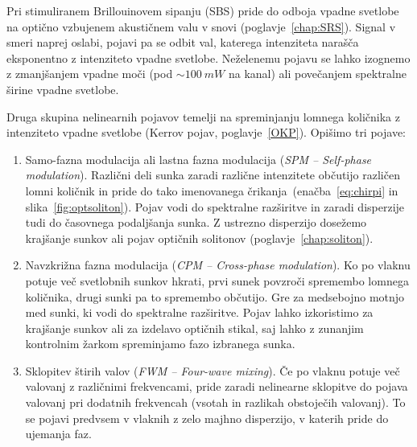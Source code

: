 Pri stimuliranem Brillouinovem sipanju (SBS) pride
 do odboja vpadne svetlobe na 
optično vzbujenem akustičnem valu v snovi (poglavje~\ref{chap:SRS}). Signal
v smeri naprej oslabi, pojavi pa se odbit val, katerega intenziteta
narašča eksponentno z intenziteto vpadne svetlobe. 
Neželenemu pojavu se lahko izognemo z zmanjšanjem vpadne
moči (pod $\sim 100~\si{mW}$ na kanal) 
ali povečanjem spektralne širine vpadne svetlobe.

Druga skupina nelinearnih pojavov temelji na spreminjanju 
lomnega količnika z intenziteto vpadne svetlobe (Kerrov pojav, poglavje~\ref{OKP}).
Opišimo tri pojave:
\begin{enumerate}
\item 
Samo-fazna modulacija ali lastna fazna modulacija ({\it SPM -- Self-phase modulation}). Različni deli
sunka zaradi različne intenzitete občutijo različen lomni količnik in pride
do tako imenovanega črikanja~(enačba~\ref{eq:chirpi} 
in slika~\ref{fig:optsoliton}). 
Pojav vodi do spektralne razširitve in zaradi
disperzije tudi do časovnega podaljšanja sunka. Z ustrezno disperzijo dosežemo 
krajšanje sunkov ali pojav optičnih solitonov (poglavje~\ref{chap:soliton}).

\item
Navzkrižna fazna modulacija ({\it CPM -- Cross-phase modulation}). Ko po vlaknu
potuje več svetlobnih sunkov hkrati, prvi sunek povzroči spremembo lomnega količnika, 
drugi sunki pa to spremembo občutijo. Gre za medsebojno motnjo med sunki, ki 
vodi do spektralne razširitve. Pojav lahko izkoristimo za krajšanje sunkov ali
za izdelavo optičnih stikal, 
saj lahko z zunanjim kontrolnim žarkom spreminjamo fazo izbranega sunka. 

\item
Sklopitev štirih valov ({\it FWM -- Four-wave mixing}). Če po vlaknu potuje več
valovanj z različnimi frekvencami, 
pride zaradi nelinearne sklopitve do pojava
valovanj pri dodatnih frekvencah (vsotah in razlikah obstoječih valovanj). To se pojavi
predvsem v vlaknih z zelo majhno disperzijo, v katerih pride do ujemanja
faz.  
\end{enumerate}
